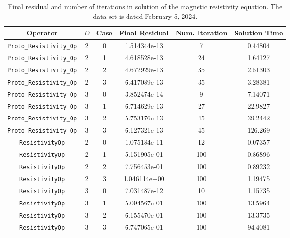 \documentclass{article}
\begin{document}
\begin{small}
\begin{table}
\begin{center}
\begin{tabular}{|c|c|c|c|c||c|} \hline
 Operator                   & $D$ & Case & Final Residual &
 Num. Iteration & Solution Time\\
\hline
 \hline
 {\tt Proto\_Resistivity\_Op}     & 2   & 0    & 1.514344e-13   &        7 & 0.44804\\
 {\tt Proto\_Resistivity\_Op}     & 2   & 1    & 4.618528e-13   &       24 & 1.64127\\
 {\tt Proto\_Resistivity\_Op}     & 2   & 2    & 4.672929e-13   &       35 & 2.51303\\
 {\tt Proto\_Resistivity\_Op}     & 2   & 3    & 6.417089e-13   &       35 & 3.28381\\
 {\tt Proto\_Resistivity\_Op}     & 3   & 0    & 3.852474e-14   &        9 & 7.14071\\
 {\tt Proto\_Resistivity\_Op}     & 3   & 1    & 6.714629e-13   &       27 & 22.9827\\
 {\tt Proto\_Resistivity\_Op}     & 3   & 2    & 5.753176e-13   &       45 & 39.2442\\
 {\tt Proto\_Resistivity\_Op}     & 3   & 3    & 6.127321e-13   &       45 & 126.269\\
 \hline
 {\tt ResistivityOp}              & 2   & 0    & 1.075184e-11   &   12& 0.07357\\
 {\tt ResistivityOp}              & 2   & 1    & 5.151905e-01   &  100& 0.86896\\
 {\tt ResistivityOp}              & 2   & 2    & 7.756453e-01   &  100& 0.89232\\
 {\tt ResistivityOp}              & 2   & 3    & 1.046114e+00   &  100& 1.19475\\
 {\tt ResistivityOp}              & 3   & 0    & 7.031487e-12   &   10& 1.15735\\
 {\tt ResistivityOp}              & 3   & 1    & 5.094567e-01   &  100& 13.5964\\
 {\tt ResistivityOp}              & 3   & 2    & 6.155470e-01   &  100& 13.3735\\
 {\tt ResistivityOp}              & 3   & 3    & 6.747065e-01   &  100& 94.4081\\
\hline
\end{tabular}
\end{center}
\label{tab::resist1}
\caption
    {
      Final residual and number of iterations in solution of the
      magnetic resistivity equation.
      The data set is dated February 5, 2024.
    }
\end{table}
\end{small}
\end{document}
